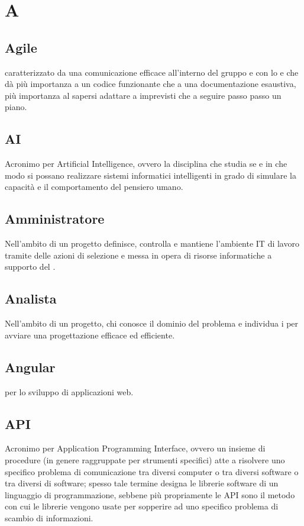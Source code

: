 \chapter{A}

\section{Agile}
 caratterizzato da una comunicazione efficace all'interno del gruppo e con lo  e che dà più importanza a un codice funzionante che a una documentazione esaustiva, più importanza al sapersi adattare a imprevisti che a seguire passo passo un piano.

\section{AI} \label{sec:Artificial Intelligence}
Acronimo per Artificial Intelligence, ovvero la disciplina che studia se e in che modo si possano realizzare sistemi informatici intelligenti in grado di simulare la capacità e il comportamento del pensiero umano.

\section{Amministratore} \label{sec:Amministratori}
Nell'ambito di un progetto definisce, controlla e mantiene l'ambiente IT di lavoro tramite delle azioni di selezione e messa in opera di risorse informatiche a supporto del . 

\section{Analista}\label{sec:Analisti}
Nell'ambito di un progetto, chi conosce il dominio del problema e individua i  per avviare una progettazione efficace ed efficiente.

\section{Angular}
  per lo sviluppo di applicazioni web.

\section{API}\label{sec:Application Programming Interface}
Acronimo per Application Programming Interface, ovvero un insieme di procedure (in genere raggruppate per strumenti specifici) atte a risolvere uno specifico problema di comunicazione tra diversi computer o tra diversi software o tra diversi  di software; spesso tale termine designa le librerie software di un linguaggio di programmazione, sebbene più propriamente le API sono il metodo con cui le librerie vengono usate per sopperire ad uno specifico problema di scambio di informazioni.

